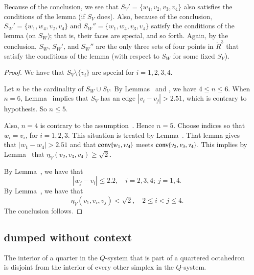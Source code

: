 \begin{remark}
Because of the conclusion,
we see that $S_V'=\{w_4,v_2,v_3,v_4\}$ also satisfies the
conditions of the lemma (if $S_V$ does). 
Also, because of the conclusion,
$S_W' = \{w_1,w_4,v_2,v_4\}$ and $S_W''=\{w_1,w_4,v_3,v_4\}$
satisfy the conditions of the lemma (on $S_W$); that is,
their faces are special, and so forth.
Again, by the conclusion, $S_W$, $S_W'$, and $S_W''$ are the
only three sets of four points in $\ring{R}^3$ that satisfy
the conditions of the lemma (with respect to 
$S_W$ for some fixed $S_V$).
\end{remark}

\begin{proof}
We have that $S_V\setminus\{v_i\}$ are
special for $i=1,2,3,4$.

Let $n$ be the cardinality of $S_W\cup S_V$.  By Lemmas~
and , we have $4\le n\le 6$.  When
$n=6$, Lemma~ implies that $S_V$ has an edge
$|v_i-v_j|>2.51$, which is contrary to hypothesis.  So $n\le 5$.

Also, $n=4$ is contrary to the assumption~. 
Hence $n=5$.  
Choose indices so that $w_i=v_i$, for $i=1,2,3$. 
This situation is treated by Lemma~.
That lemma gives that $|w_1-w_4|>2.51$ and that
  ${\operatorname{conv}}\{w_1,w_4\}$ meets ${\operatorname{conv}}\{v_2,v_3,v_4\}$.
This implies by Lemma~ that 
$\eta_V(v_2,v_3,v_4)\ge\sqrt2$.

By Lemma~, we have that 
$$|w_j-v_i|\le 2.2,\quad i=2,3,4;\ j=1,4.$$
By Lemma~, we have that 
 $$\eta_V(v_1,v_i,v_j) < \sqrt2,\quad 2\le i < j \le 4.$$
The conclusion follows.
\end{proof}


\newpage
\subsection{dumped without context}



\begin{lemma} 
The interior of a quarter in the $Q$-system that is part of a
quartered octahedron is disjoint from the interior of every other
simplex in the $Q$-system.
\end{lemma}

